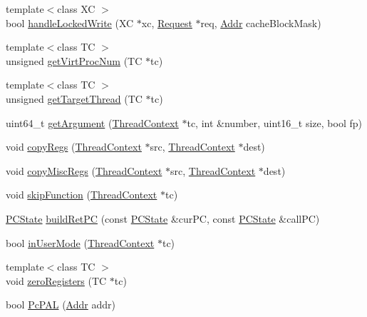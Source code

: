 \begin{DoxyCompactItemize}
\item 
{\footnotesize template$<$class XC $>$ }\\bool \hyperlink{namespaceAlphaISA_a1087208351cf56657581daf8f2f918c8}{handleLockedWrite} (XC $\ast$xc, \hyperlink{classRequest}{Request} $\ast$req, \hyperlink{classm5_1_1params_1_1Addr}{Addr} cacheBlockMask)
\item 
{\footnotesize template$<$class TC $>$ }\\unsigned \hyperlink{namespaceAlphaISA_a9f62368d1287f246b4026dfb6206bc4d}{getVirtProcNum} (TC $\ast$tc)
\item 
{\footnotesize template$<$class TC $>$ }\\unsigned \hyperlink{namespaceAlphaISA_a7956606c6fe17700d24242789ae5002c}{getTargetThread} (TC $\ast$tc)
\item 
uint64\_\-t \hyperlink{namespaceAlphaISA_a3f9560369e934be05b1dd8f23fbd6104}{getArgument} (\hyperlink{classThreadContext}{ThreadContext} $\ast$tc, int \&number, uint16\_\-t size, bool fp)
\item 
void \hyperlink{namespaceAlphaISA_aaeffcccf262b0dbd3cbcc8b4cef41168}{copyRegs} (\hyperlink{classThreadContext}{ThreadContext} $\ast$src, \hyperlink{classThreadContext}{ThreadContext} $\ast$dest)
\item 
void \hyperlink{namespaceAlphaISA_a42833096094e5ff0f2de948bf8e5965c}{copyMiscRegs} (\hyperlink{classThreadContext}{ThreadContext} $\ast$src, \hyperlink{classThreadContext}{ThreadContext} $\ast$dest)
\item 
void \hyperlink{namespaceAlphaISA_a2624d7d8bac3eb03de2eb6e83903c208}{skipFunction} (\hyperlink{classThreadContext}{ThreadContext} $\ast$tc)
\item 
\hyperlink{classGenericISA_1_1SimplePCState}{PCState} \hyperlink{namespaceAlphaISA_a7480844aa2eaec6bd5e60412bf6c4a38}{buildRetPC} (const \hyperlink{classGenericISA_1_1SimplePCState}{PCState} \&curPC, const \hyperlink{classGenericISA_1_1SimplePCState}{PCState} \&callPC)
\item 
bool \hyperlink{namespaceAlphaISA_a166daa198f05f80c18b5249f18a0675e}{inUserMode} (\hyperlink{classThreadContext}{ThreadContext} $\ast$tc)
\item 
{\footnotesize template$<$class TC $>$ }\\void \hyperlink{namespaceAlphaISA_ae69d09a8a385eb3239db7d28788f9f3f}{zeroRegisters} (TC $\ast$tc)
\item 
bool \hyperlink{namespaceAlphaISA_a890ffda2717ffc0e2cd0e9f80b90fad2}{PcPAL} (\hyperlink{classm5_1_1params_1_1Addr}{Addr} addr)

\end{DoxyCompactItemize}
